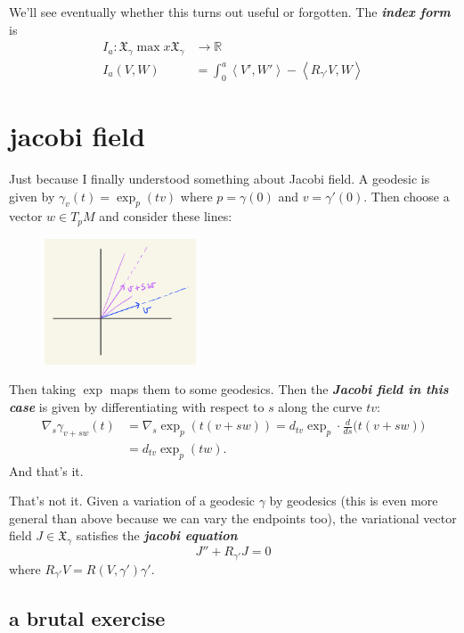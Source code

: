 We'll see eventually whether this turns out useful or forgotten. The \textit{\textbf{index form}} is
 \begin{align*}
	I_a: \mathfrak{X}_\gamma\operatorname{max}x \mathfrak{X}_\gamma &\longrightarrow \mathbb{R} \\
	I_a(V,W) &=\int_0^a \left<V',W'\right>-\left<R_{\gamma'}V,W\right>
\end{align*}


\section{jacobi field}

Just because I finally understood something about Jacobi field. A geodesic is given by \(\gamma_v(t)=\operatorname{exp}_p(tv)\) where \(p=\gamma(0)\) and \(v=\gamma'(0)\). Then choose a vector \(w \in T_pM\) and consider these lines:
\begin{figure}[H]
	\centering
	\includegraphics[width=0.4\textwidth]{fig2}
\end{figure}
Then taking \(\operatorname{exp}\) maps them to some geodesics. Then the \textit{\textbf{Jacobi field in this case}} is given by differentiating with respect to \(s\) along the curve \(tv\):
\begin{align*}\nabla_s \gamma_{v+sw}(t)&=\nabla_s \operatorname{exp}_p(t(v+sw))=d_{tv}\operatorname{exp}_p\cdot \frac{d}{ds}\Big(t(v+sw)\Big)\\&=d_{tv}\operatorname{exp}_p(tw).\end{align*}
And that's it.

That's not it. Given a variation of a geodesic \(\gamma\) by geodesics (this is even more general than above because we can vary the endpoints too), the variational vector field \(J \in \mathfrak{X}_\gamma\) satisfies the \textit{\textbf{jacobi equation}} 
\[J''+R_{\gamma'}J=0\]
where \(R_{\gamma'}V=R(V,\gamma')\gamma'\).

\subsection{a brutal exercise}

